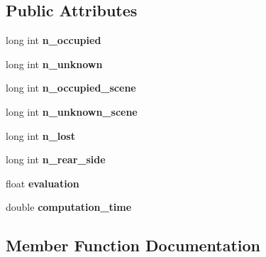 \subsection*{Public Attributes}
\begin{DoxyCompactItemize}
\item 
long int {\bfseries n\+\_\+occupied}\hypertarget{classEvaluationResult_af103614b995a13fc83595d64a8b199b9}{}\label{classEvaluationResult_af103614b995a13fc83595d64a8b199b9}

\item 
long int {\bfseries n\+\_\+unknown}\hypertarget{classEvaluationResult_ae43724b41f26e66dc2a5a6723d6509e2}{}\label{classEvaluationResult_ae43724b41f26e66dc2a5a6723d6509e2}

\item 
long int {\bfseries n\+\_\+occupied\+\_\+scene}\hypertarget{classEvaluationResult_a1cc45ff82e740750575694dc0e650adf}{}\label{classEvaluationResult_a1cc45ff82e740750575694dc0e650adf}

\item 
long int {\bfseries n\+\_\+unknown\+\_\+scene}\hypertarget{classEvaluationResult_afbd0c6e48cc3db5ddb7f1d8fd82a036d}{}\label{classEvaluationResult_afbd0c6e48cc3db5ddb7f1d8fd82a036d}

\item 
long int {\bfseries n\+\_\+lost}\hypertarget{classEvaluationResult_a4e5c5cee69789783cec8e7561cafde97}{}\label{classEvaluationResult_a4e5c5cee69789783cec8e7561cafde97}

\item 
long int {\bfseries n\+\_\+rear\+\_\+side}\hypertarget{classEvaluationResult_a778db5956b7a78f68ff2604d5d4c9313}{}\label{classEvaluationResult_a778db5956b7a78f68ff2604d5d4c9313}

\item 
float {\bfseries evaluation}\hypertarget{classEvaluationResult_aedb8f060d50873740bcce4069efd081f}{}\label{classEvaluationResult_aedb8f060d50873740bcce4069efd081f}

\item 
double {\bfseries computation\+\_\+time}\hypertarget{classEvaluationResult_aac898e8a214a5eb5dc76725c37fda7bb}{}\label{classEvaluationResult_aac898e8a214a5eb5dc76725c37fda7bb}

\end{DoxyCompactItemize}


\subsection{Member Function Documentation}
